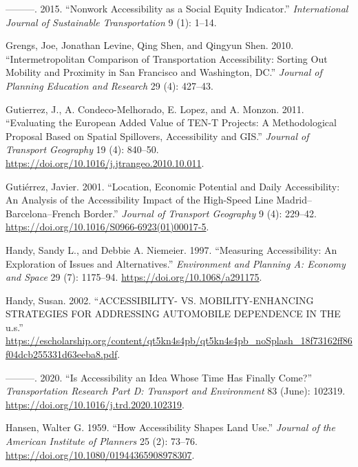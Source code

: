 \documentclass[
]{article}
\newlength{\cslhangindent}
\newenvironment{CSLReferences}[2] %
 {\begin{list}{}{%
  \setlength{\itemindent}{0pt}
  \setlength{\leftmargin}{0pt}
  \setlength{\parsep}{0pt}
  \ifodd #1
   \setlength{\leftmargin}{\cslhangindent}
   \setlength{\itemindent}{-1\cslhangindent}
  \fi
  \setlength{\itemsep}{#2\baselineskip}}}
 {\end{list}}
\begin{document}
\begin{CSLReferences}{1}{0}
---------. 2015. {``Nonwork Accessibility as a Social Equity
Indicator.''} \emph{International Journal of Sustainable Transportation}
9 (1): 1--14.

Grengs, Joe, Jonathan Levine, Qing Shen, and Qingyun Shen. 2010.
{``Intermetropolitan Comparison of Transportation Accessibility: Sorting
Out Mobility and Proximity in San Francisco and Washington, DC.''}
\emph{Journal of Planning Education and Research} 29 (4): 427--43.

Gutierrez, J., A. Condeco-Melhorado, E. Lopez, and A. Monzon. 2011.
{``Evaluating the {European} Added Value of {TEN}-{T} Projects: A
Methodological Proposal Based on Spatial Spillovers, Accessibility and
{GIS}.''} \emph{Journal of Transport Geography} 19 (4): 840--50.
\url{https://doi.org/10.1016/j.jtrangeo.2010.10.011}.

Gutiérrez, Javier. 2001. {``Location, Economic Potential and Daily
Accessibility: An Analysis of the Accessibility Impact of the High-Speed
Line Madrid--Barcelona--French Border.''} \emph{Journal of Transport
Geography} 9 (4): 229--42.
\url{https://doi.org/10.1016/S0966-6923(01)00017-5}.

Handy, Sandy L., and Debbie A. Niemeier. 1997. {``Measuring
Accessibility: An Exploration of Issues and Alternatives.''}
\emph{Environment and Planning A: Economy and Space} 29 (7): 1175--94.
\url{https://doi.org/10.1068/a291175}.

Handy, Susan. 2002. {``{ACCESSIBILITY}- {VS}. {MOBILITY}-{ENHANCING}
{STRATEGIES} {FOR} {ADDRESSING} {AUTOMOBILE} {DEPENDENCE} {IN} {THE}
u.s.''}
\url{https://escholarship.org/content/qt5kn4s4pb/qt5kn4s4pb_noSplash_18f73162ff86f04dcb255331d63eeba8.pdf}.

---------. 2020. {``Is Accessibility an Idea Whose Time Has Finally
Come?''} \emph{Transportation Research Part D: Transport and
Environment} 83 (June): 102319.
\url{https://doi.org/10.1016/j.trd.2020.102319}.

Hansen, Walter G. 1959. {``How Accessibility Shapes Land Use.''}
\emph{Journal of the American Institute of Planners} 25 (2): 73--76.
\url{https://doi.org/10.1080/01944365908978307}.


\end{CSLReferences}
\end{document}
